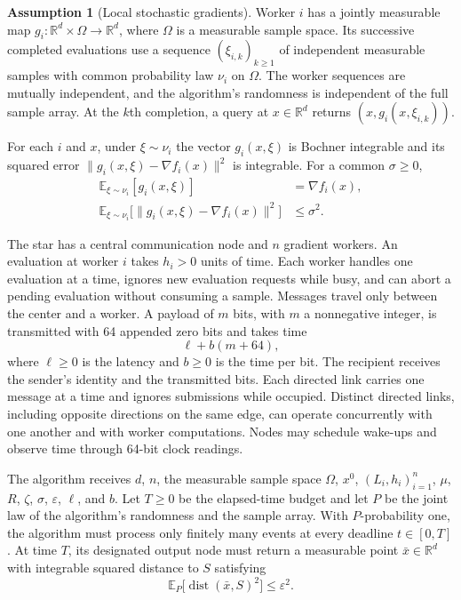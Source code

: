 \documentclass[10pt]{article}
\theoremstyle{definition}
\newtheorem{assumption}{Assumption}
\begin{document}
\begin{assumption}[Local stochastic gradients]
Worker $i$ has a jointly measurable map $g_i:\mathbb{R}^d\times\Omega\to\mathbb{R}^d$, where $\Omega$ is a measurable sample space. Its successive completed evaluations use a sequence $(\xi_{i,k})_{k\geq 1}$ of independent measurable samples with common probability law $\nu_i$ on $\Omega$. The worker sequences are mutually independent, and the algorithm's randomness is independent of the full sample array. At the $k$th completion, a query at $x\in\mathbb{R}^d$ returns $(x,g_i(x,\xi_{i,k}))$.

For each $i$ and $x$, under $\xi\sim\nu_i$ the vector $g_i(x,\xi)$ is Bochner integrable and its squared error $\|g_i(x,\xi)-\nabla f_i(x)\|^2$ is integrable. For a common $\sigma\geq 0$,
\[
\begin{aligned}
\mathbb{E}_{\xi\sim\nu_i}[g_i(x,\xi)] &= \nabla f_i(x),\\
\mathbb{E}_{\xi\sim\nu_i}\bigl[\|g_i(x,\xi)-\nabla f_i(x)\|^2\bigr] &\leq \sigma^2.
\end{aligned}
\]
\end{assumption}

The star has a central communication node and $n$ gradient workers. An evaluation at worker $i$ takes $h_i>0$ units of time. Each worker handles one evaluation at a time, ignores new evaluation requests while busy, and can abort a pending evaluation without consuming a sample. Messages travel only between the center and a worker. A payload of $m$ bits, with $m$ a nonnegative integer, is transmitted with 64 appended zero bits and takes time
\[
\ell+b(m+64),
\]
where $\ell\geq 0$ is the latency and $b\geq 0$ is the time per bit. The recipient receives the sender's identity and the transmitted bits. Each directed link carries one message at a time and ignores submissions while occupied. Distinct directed links, including opposite directions on the same edge, can operate concurrently with one another and with worker computations. Nodes may schedule wake-ups and observe time through 64-bit clock readings.

The algorithm receives $d$, $n$, the measurable sample space $\Omega$, $x^0$, $(L_i,h_i)_{i=1}^n$, $\mu$, $R$, $\zeta$, $\sigma$, $\varepsilon$, $\ell$, and $b$. Let $T\geq 0$ be the elapsed-time budget and let $P$ be the joint law of the algorithm's randomness and the sample array. With $P$-probability one, the algorithm must process only finitely many events at every deadline $t\in[0,T]$. At time $T$, its designated output node must return a measurable point $\bar{x}\in\mathbb{R}^d$ with integrable squared distance to $S$ satisfying
\[
\mathbb{E}_P\bigl[\operatorname{dist}(\bar{x},S)^2\bigr]\leq\varepsilon^2.
\]
\end{document}
